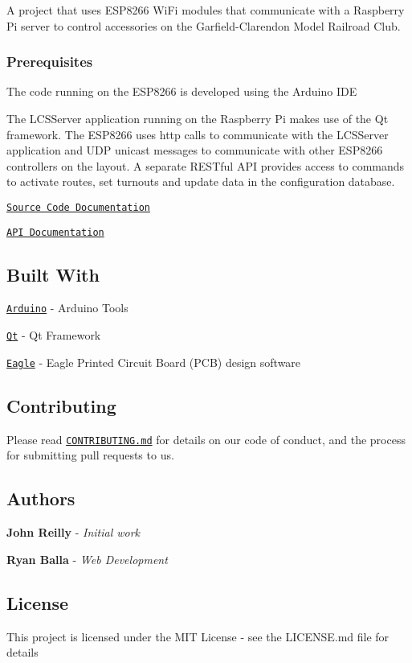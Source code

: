 A project that uses E\+S\+P8266 Wi\+Fi modules that communicate with a Raspberry Pi server to control accessories on the Garfield-\/\+Clarendon Model Railroad Club.

\subsubsection*{Prerequisites}

The code running on the E\+S\+P8266 is developed using the Arduino I\+DE

The L\+C\+S\+Server application running on the Raspberry Pi makes use of the Qt framework. The E\+S\+P8266 uses http calls to communicate with the L\+C\+S\+Server application and U\+DP unicast messages to communicate with other E\+S\+P8266 controllers on the layout. A separate R\+E\+S\+Tful A\+PI provides access to commands to activate routes, set turnouts and update data in the configuration database.

\href{https://garfieldclarendon.github.io/html/index.html}{\tt Source Code Documentation}

\href{https://garfieldclarendon.github.io/apidoc/index.html}{\tt A\+PI Documentation}

\subsection*{Built With}


\begin{DoxyItemize}
\item \href{https://www.arduino.cc/en/Main/Software}{\tt Arduino} -\/ Arduino Tools
\item \href{https://www.qt.io/}{\tt Qt} -\/ Qt Framework
\item \href{https://www.autodesk.com/products/eagle/overview}{\tt Eagle} -\/ Eagle Printed Circuit Board (P\+CB) design software
\end{DoxyItemize}

\subsection*{Contributing}

Please read \href{https://gist.github.com/PurpleBooth/b24679402957c63ec426}{\tt C\+O\+N\+T\+R\+I\+B\+U\+T\+I\+N\+G.\+md} for details on our code of conduct, and the process for submitting pull requests to us.

\subsection*{Authors}


\begin{DoxyItemize}
\item {\bfseries John Reilly} -\/ {\itshape Initial work}
\item {\bfseries Ryan Balla} -\/ {\itshape Web Development}
\end{DoxyItemize}

\subsection*{License}

This project is licensed under the M\+IT License -\/ see the L\+I\+C\+E\+N\+SE.md file for details 